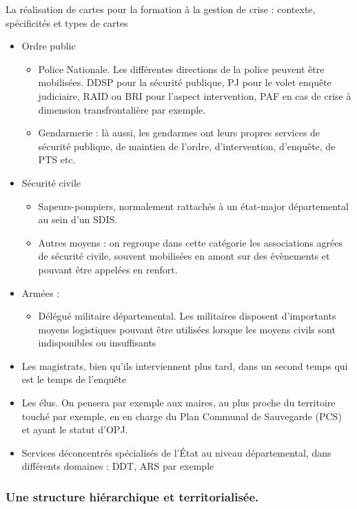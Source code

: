 \documentclass[10pt,a4paper]{report} %
\begin{document}
\begin{part}{La réalisation de cartes pour la formation à la gestion de crise : contexte, spécificités et types de cartes}
\begin{itemize}
    \item Ordre public
    \begin{itemize}
        \item Police Nationale. Les différentes directions de la police peuvent être mobilisées. DDSP pour la sécurité publique, PJ pour le volet enquête judiciaire, RAID ou BRI pour l’aspect intervention, PAF en cas de crise à dimension transfrontalière par exemple.
        \item Gendarmerie : là aussi, les gendarmes ont leurs propres services de sécurité publique, de maintien de l’ordre, d’intervention, d’enquête, de PTS etc.
    \end{itemize}
    \item Sécurité civile
    \begin{itemize}
        \item Sapeurs-pompiers, normalement rattachés à un état-major départemental au sein d’un SDIS.
        \item Autres moyens : on regroupe dans cette catégorie les associations agrées de sécurité civile, souvent mobilisées en amont sur des évènements et pouvant être appelées en renfort.
    \end{itemize}
    \item Armées :
    \begin{itemize}
        \item[] Délégué militaire départemental. Les militaires disposent d’importants moyens logistiques pouvant être utilisées lorsque les moyens civils sont indisponibles ou insuffisants
    \end{itemize}
    \item Les magistrats, bien qu’ils interviennent plus tard, dans un second temps qui est le temps de l’enquête
    \item Les élus. On pensera par exemple aux maires, au plus proche du territoire touché par exemple, en en charge du Plan Communal de Sauvegarde (PCS) et ayant le statut d’OPJ.
    \item Services déconcentrés spécialisés de l’État au niveau départemental, dans différents domaines : DDT, ARS par exemple
\end{itemize}

\subsubsection{Une structure hiérarchique et territorialisée.}


\end{part}
\end{document}
